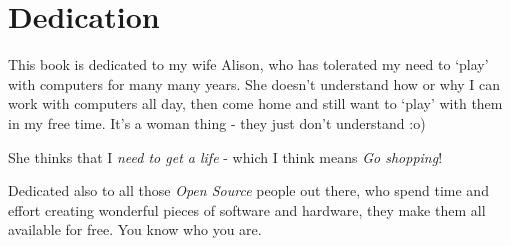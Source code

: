 \section*{Dedication}\label{dedication}

This book is dedicated to my wife Alison, who has tolerated my need to `play' with computers for many many years. She doesn't understand how or why I can work with computers all day, then come home and still want to `play' with them in my free time. It's a woman thing - they just don't understand :o)

She thinks that I \emph{need to get a life} - which I think means
\emph{Go shopping}!

Dedicated also to all those \emph{Open Source} people out there, who spend time and effort creating wonderful pieces of software and hardware, they make them all available for free. You know who you are.
